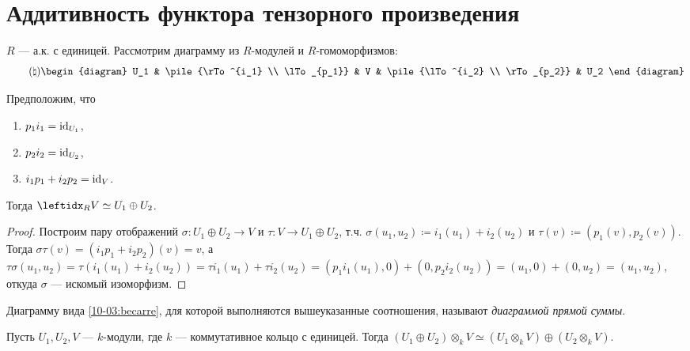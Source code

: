 \section{Аддитивность функтора тензорного произведения}

\begin{lem*}
    $R$ --- а.к. с единицей. Рассмотрим диаграмму из $R$-модулей и $R$-гомоморфизмов:
    \begin{equation}\tag{$\natural$}\label{10-03:becarre}
        \begin{diagram}
            U_1 & \pile{\rTo^{i_1} \\ \lTo_{p_1}} & V & \pile{\lTo^{i_2} \\ \rTo_{p_2}} & U_2
        \end{diagram}
    \end{equation}
    
    Предположим, что \begin{enumerate}
        \item $p_1 i_1 = \operatorname{id}_{U_1}$,
        \item $p_2 i_2 = \operatorname{id}_{U_2}$,
        \item $i_1 p_1 + i_2 p_2 = \operatorname{id}_V$.
    \end{enumerate}
    Тогда $\lsub{R}{V} \simeq U_1 \oplus U_2$.
\end{lem*}

\begin{proof}
    Построим пару отображений $\sigma \colon U_1 \oplus U_2 \to V$ и $\tau \colon V \to U_1 \oplus U_2$, т.ч. $\sigma(u_1, u_2) \coloneqq i_1(u_1) + i_2(u_2)$ и $\tau(v) \coloneqq (p_1(v), p_2(v))$. Тогда $\sigma \tau(v) = (i_1 p_1 + i_2 p_2)(v) = v$, а $\tau \sigma(u_1, u_2) = \tau(i_1(u_1) + i_2(u_2)) = \tau i_1(u_1) + \tau i_2(u_2) = (p_1 i_1(u_1), 0) + (0, p_2 i_2(u_2)) = (u_1, 0) + (0, u_2) = (u_1, u_2)$, откуда $\sigma$ --- искомый изоморфизм.
\end{proof}

\begin{defn}
    Диаграмму вида \eqref{10-03:becarre}, для которой выполняются вышеуказанные соотношения, называют \textit{диаграммой прямой суммы}.
\end{defn}

\begin{thm*}
    Пусть $U_1, U_2, V$ --- $k$-модули, где $k$ --- коммутативное кольцо с единицей. Тогда $(U_1 \oplus U_2) \otimes_k V \simeq (U_1 \otimes_k V) \oplus (U_2 \otimes_k V)$.
\end{thm*}

